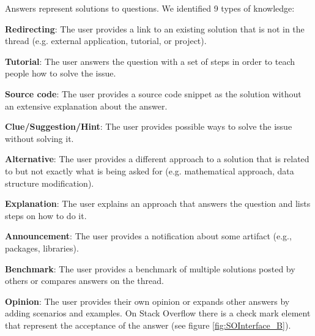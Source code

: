 \documentclass{sig-alternate-05-2015}
\begin{document}
	Answers represent solutions to questions.
	We identified 9 types of knowledge:
	\begin{packed_enum}
	\item \textbf{Redirecting}: The user provides a link to an existing solution that is not in the thread (e.g. external application, tutorial, or project).
	\item \textbf{Tutorial}: The user answers the question with a set of steps in order to teach people how to solve the issue.
	\item \textbf{Source code}: The user provides a source code snippet as the solution without an extensive explanation about the answer.
	\item \textbf{Clue/Suggestion/Hint}: The user provides possible ways to solve the issue without solving it.
	\item \textbf{Alternative}: The user provides a different approach to a solution that is related to but not exactly what is being asked for (e.g. mathematical approach, data structure modification).
	\item \textbf{Explanation}: The user explains an approach that answers the question and lists steps on how to do it.
	\item \textbf{Announcement}: The user provides a notification about some artifact (e.g., packages, libraries).
	\item \textbf{Benchmark}: The user provides a benchmark of multiple solutions posted by others or compares answers on the thread.
	\item \textbf{Opinion}: The user provides their own opinion or expands other answers by adding scenarios and examples.
    On Stack Overflow there is a check mark element that represent the acceptance of the answer (see figure \ref{fig:SOInterface_B}).
	\end{packed_enum}


\end{document}
